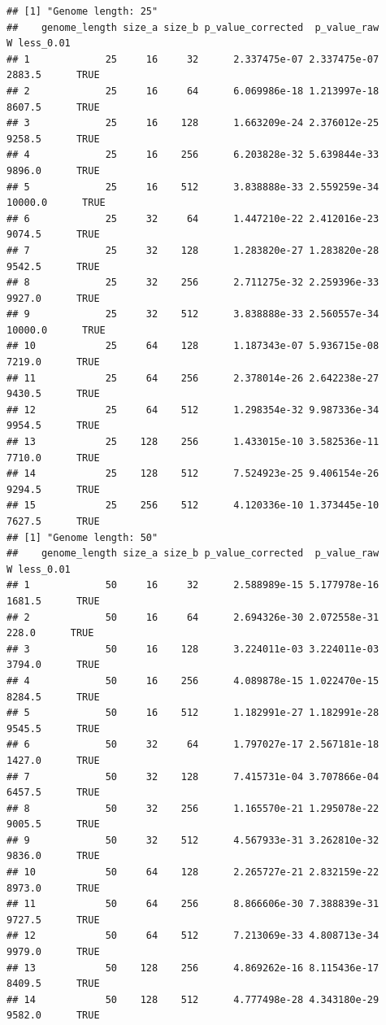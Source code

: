 \documentclass[
]{book}
\begin{document}
\begin{verbatim}
## [1] "Genome length: 25"
##    genome_length size_a size_b p_value_corrected  p_value_raw       W less_0.01
## 1             25     16     32      2.337475e-07 2.337475e-07  2883.5      TRUE
## 2             25     16     64      6.069986e-18 1.213997e-18  8607.5      TRUE
## 3             25     16    128      1.663209e-24 2.376012e-25  9258.5      TRUE
## 4             25     16    256      6.203828e-32 5.639844e-33  9896.0      TRUE
## 5             25     16    512      3.838888e-33 2.559259e-34 10000.0      TRUE
## 6             25     32     64      1.447210e-22 2.412016e-23  9074.5      TRUE
## 7             25     32    128      1.283820e-27 1.283820e-28  9542.5      TRUE
## 8             25     32    256      2.711275e-32 2.259396e-33  9927.0      TRUE
## 9             25     32    512      3.838888e-33 2.560557e-34 10000.0      TRUE
## 10            25     64    128      1.187343e-07 5.936715e-08  7219.0      TRUE
## 11            25     64    256      2.378014e-26 2.642238e-27  9430.5      TRUE
## 12            25     64    512      1.298354e-32 9.987336e-34  9954.5      TRUE
## 13            25    128    256      1.433015e-10 3.582536e-11  7710.0      TRUE
## 14            25    128    512      7.524923e-25 9.406154e-26  9294.5      TRUE
## 15            25    256    512      4.120336e-10 1.373445e-10  7627.5      TRUE
## [1] "Genome length: 50"
##    genome_length size_a size_b p_value_corrected  p_value_raw      W less_0.01
## 1             50     16     32      2.588989e-15 5.177978e-16 1681.5      TRUE
## 2             50     16     64      2.694326e-30 2.072558e-31  228.0      TRUE
## 3             50     16    128      3.224011e-03 3.224011e-03 3794.0      TRUE
## 4             50     16    256      4.089878e-15 1.022470e-15 8284.5      TRUE
## 5             50     16    512      1.182991e-27 1.182991e-28 9545.5      TRUE
## 6             50     32     64      1.797027e-17 2.567181e-18 1427.0      TRUE
## 7             50     32    128      7.415731e-04 3.707866e-04 6457.5      TRUE
## 8             50     32    256      1.165570e-21 1.295078e-22 9005.5      TRUE
## 9             50     32    512      4.567933e-31 3.262810e-32 9836.0      TRUE
## 10            50     64    128      2.265727e-21 2.832159e-22 8973.0      TRUE
## 11            50     64    256      8.866606e-30 7.388839e-31 9727.5      TRUE
## 12            50     64    512      7.213069e-33 4.808713e-34 9979.0      TRUE
## 13            50    128    256      4.869262e-16 8.115436e-17 8409.5      TRUE
## 14            50    128    512      4.777498e-28 4.343180e-29 9582.0      TRUE

\end{verbatim}
\end{document}

